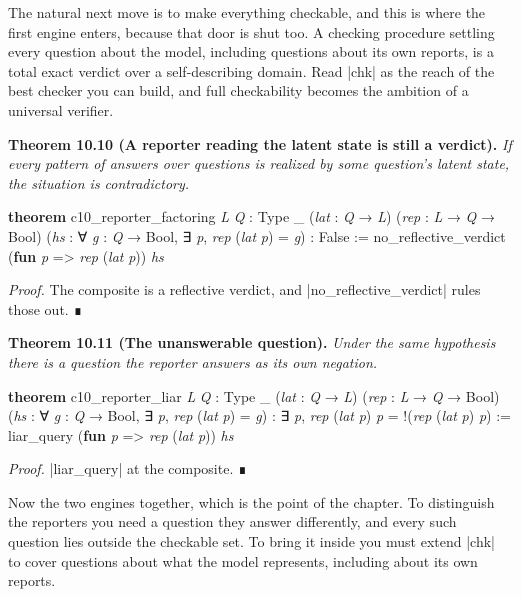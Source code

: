 \documentclass{memoir}
\begin{document}
The natural next move is to make everything checkable, and this is where the
first engine enters, because that door is shut too. A checking procedure
settling every question about the model, including questions about its own
reports, is a total exact verdict over a self-describing domain. Read \LeanVerb|chk| as
the reach of the best checker you can build, and full checkability becomes the
ambition of a universal verifier.

\textbf{Theorem 10.10 (A reporter reading the latent state is still a verdict).}
\emph{If every pattern of answers over questions is realized by some question's
latent state, the situation is contradictory.}

\begin{LeanVerbatim}
\textbf{theorem} c10_reporter_factoring \textit{L} \textit{Q} : Type _
    (\textit{lat} : \textit{Q} → \textit{L}) (\textit{rep} : \textit{L} → \textit{Q} → Bool)
    (\textit{hs} : ∀ \textit{g} : \textit{Q} → Bool, ∃ \textit{p}, \textit{rep} (\textit{lat} \textit{p}) = \textit{g}) : False :=
  no_reflective_verdict (\textbf{fun} \textit{p} => \textit{rep} (\textit{lat} \textit{p})) \textit{hs}

\end{LeanVerbatim}


\emph{Proof.} The composite is a reflective verdict, and
\LeanVerb|no_reflective_verdict| rules those out. ∎

\textbf{Theorem 10.11 (The unanswerable question).} \emph{Under the same hypothesis
there is a question the reporter answers as its own negation.}

\begin{LeanVerbatim}
\textbf{theorem} c10_reporter_liar \textit{L} \textit{Q} : Type _
    (\textit{lat} : \textit{Q} → \textit{L}) (\textit{rep} : \textit{L} → \textit{Q} → Bool)
    (\textit{hs} : ∀ \textit{g} : \textit{Q} → Bool, ∃ \textit{p}, \textit{rep} (\textit{lat} \textit{p}) = \textit{g}) :
    ∃ \textit{p}, \textit{rep} (\textit{lat} \textit{p}) \textit{p} = !(\textit{rep} (\textit{lat} \textit{p}) \textit{p}) :=
  liar_query (\textbf{fun} \textit{p} => \textit{rep} (\textit{lat} \textit{p})) \textit{hs}

\end{LeanVerbatim}


\emph{Proof.} \LeanVerb|liar_query| at the composite. ∎

Now the two engines together, which is the point of the chapter. To distinguish
the reporters you need a question they answer differently, and every such
question lies outside the checkable set. To bring it inside you must extend
\LeanVerb|chk| to cover questions about what the model represents, including about its
own reports.
\end{document}
